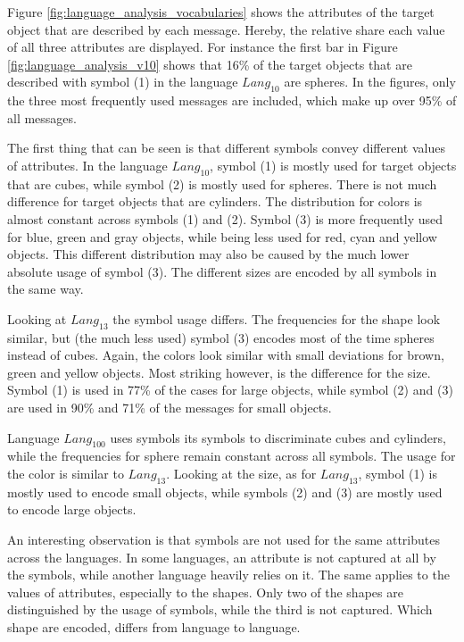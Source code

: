 Figure \ref{fig:language_analysis_vocabularies} shows the attributes of the target object that are described by each message.
Hereby, the relative share each value of all three attributes are displayed.
For instance the first bar in Figure \ref{fig:language_analysis_v10} shows that 16\% of the target objects that are described with symbol (1) in the language $Lang_{10}$ are spheres.
In the figures, only the three most frequently used messages are included, which make up over 95\% of all messages.

The first thing that can be seen is that different symbols convey different values of attributes.
In the language $Lang_{10}$, symbol (1) is mostly used for target objects that are cubes, while symbol (2) is mostly used for spheres.
There is not much difference for target objects that are cylinders.
The distribution for colors is almost constant across symbols (1) and (2).
Symbol (3) is more frequently used for blue, green and gray objects, while being less used for red, cyan and yellow objects.
This different distribution may also be caused by the much lower absolute usage of symbol (3).
The different sizes are encoded by all symbols in the same way.

Looking at $Lang_{13}$ the symbol usage differs.
The frequencies for the shape look similar, but (the much less used) symbol (3) encodes most of the time spheres instead of cubes.
Again, the colors look similar with small deviations for brown, green and yellow objects.
Most striking however, is the difference for the size.
Symbol (1) is used in 77\% of the cases for large objects, while symbol (2) and (3) are used in 90\% and 71\% of the messages for small objects.

Language $Lang_{100}$ uses symbols its symbols to discriminate cubes and cylinders, while the frequencies for sphere remain constant across all symbols.
The usage for the color is similar to $Lang_{13}$.
Looking at the size, as for $Lang_{13}$, symbol (1) is mostly used to encode small objects, while symbols (2) and (3) are mostly used to encode large objects.

An interesting observation is that symbols are not used for the same attributes across the languages.
In some languages, an attribute is not captured at all by the symbols, while another language heavily relies on it.
The same applies to the values of attributes, especially to the shapes.
Only two of the shapes are distinguished by the usage of symbols, while the third is not captured.
Which shape are encoded, differs from language to language.

